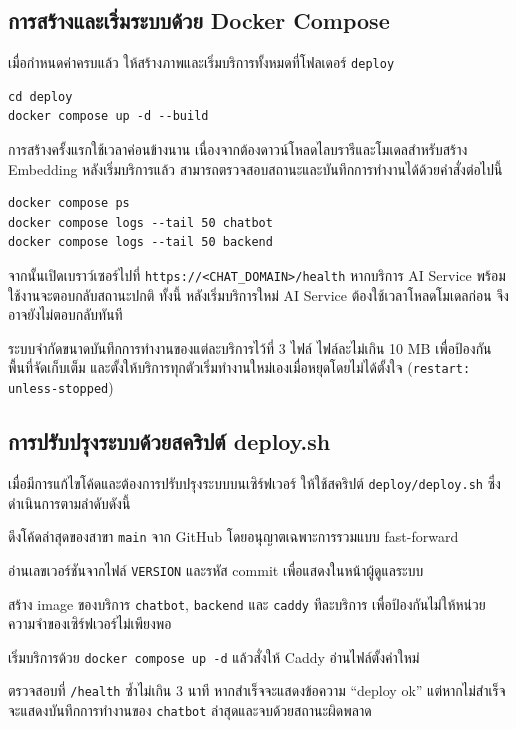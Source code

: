 \subsection{การสร้างและเริ่มระบบด้วย Docker Compose}

เมื่อกำหนดค่าครบแล้ว ให้สร้างภาพและเริ่มบริการทั้งหมดที่โฟลเดอร์ \texttt{deploy}

\begin{codeblock}
\begin{lstlisting}[numbers=none]
cd deploy
docker compose up -d --build
\end{lstlisting}
\end{codeblock}

การสร้างครั้งแรกใช้เวลาค่อนข้างนาน เนื่องจากต้องดาวน์โหลดไลบรารีและโมเดลสำหรับสร้าง Embedding หลังเริ่มบริการแล้ว สามารถตรวจสอบสถานะและบันทึกการทำงานได้ด้วยคำสั่งต่อไปนี้

\begin{codeblock}
\begin{lstlisting}[numbers=none]
docker compose ps
docker compose logs --tail 50 chatbot
docker compose logs --tail 50 backend
\end{lstlisting}
\end{codeblock}

จากนั้นเปิดเบราว์เซอร์ไปที่ \texttt{https://<CHAT\_DOMAIN>/health} หากบริการ AI Service พร้อมใช้งานจะตอบกลับสถานะปกติ ทั้งนี้ หลังเริ่มบริการใหม่ AI Service ต้องใช้เวลาโหลดโมเดลก่อน จึงอาจยังไม่ตอบกลับทันที

ระบบจำกัดขนาดบันทึกการทำงานของแต่ละบริการไว้ที่ 3 ไฟล์ ไฟล์ละไม่เกิน 10 MB เพื่อป้องกันพื้นที่จัดเก็บเต็ม และตั้งให้บริการทุกตัวเริ่มทำงานใหม่เองเมื่อหยุดโดยไม่ได้ตั้งใจ (\texttt{restart: unless-stopped})

\subsection{การปรับปรุงระบบด้วยสคริปต์ deploy.sh}

เมื่อมีการแก้ไขโค้ดและต้องการปรับปรุงระบบบนเซิร์ฟเวอร์ ให้ใช้สคริปต์ \texttt{deploy/deploy.sh} ซึ่งดำเนินการตามลำดับดังนี้

\begin{numlist}
\item ดึงโค้ดล่าสุดของสาขา \texttt{main} จาก GitHub โดยอนุญาตเฉพาะการรวมแบบ fast-forward
\item อ่านเลขเวอร์ชันจากไฟล์ \texttt{VERSION} และรหัส commit เพื่อแสดงในหน้าผู้ดูแลระบบ
\item สร้าง image ของบริการ \texttt{chatbot}, \texttt{backend} และ \texttt{caddy} ทีละบริการ เพื่อป้องกันไม่ให้หน่วยความจำของเซิร์ฟเวอร์ไม่เพียงพอ
\item เริ่มบริการด้วย \texttt{docker compose up -d} แล้วสั่งให้ Caddy อ่านไฟล์ตั้งค่าใหม่
\item ตรวจสอบที่ \texttt{/health} ซ้ำไม่เกิน 3 นาที หากสำเร็จจะแสดงข้อความ ``deploy ok'' แต่หากไม่สำเร็จจะแสดงบันทึกการทำงานของ \texttt{chatbot} ล่าสุดและจบด้วยสถานะผิดพลาด
\end{numlist}

